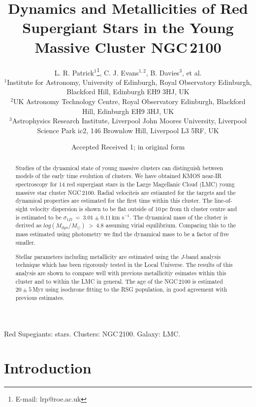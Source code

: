 \documentclass[useAMS,usenatbib]{mn2e}
\title[Dynamics and Metallicities in NGC\,2100]{Dynamics and Metallicities of Red Supergiant Stars in the Young Massive Cluster NGC\,2100}
\author[L. R. Patrick et al.]{L. R. Patrick$^{1}$\thanks{E-mail: lrp@roe.ac.uk}, C. J. Evans$^{1, 2}$, B. Davies$^{3}$, et al.\\
$^{1}$Institute for Astronomy, University of Edinburgh, Royal Observatory Edinburgh, Blackford Hill, Edinburgh EH9 3HJ, UK\\
$^{2}$UK Astronomy Technology Centre, Royal Observatory Edinburgh, Blackford Hill, Edinburgh EH9 3HJ, UK\\
$^{3}$Astrophysics Research Institute, Liverpool John Moores University, Liverpool Science Park ic2, 146 Brownlow Hill, Liverpool L3 5RF, UK
}
\def\kms{$\mbox{km s}^{-1}$}
\begin{document}
\date{Accepted  Received 1; in original form}

\pagerange{\pageref{firstpage}--\pageref{lastpage}} 

\maketitle

\label{firstpage}

\begin{abstract}
Studies of the dynamical state of young massive clusters can distinguish between models of the early time evolution of clusters.
We have obtained KMOS near-IR spectroscopy for 14 red supergiant stars in the Large Magellanic Cloud (LMC) young massive star cluster NGC\,2100.
Radial velociteis are estiamted for the targets and the dynamical properties are estimated for the first time within this cluster.
The line-of-sight velocity dispersion is shown to be flat outside of 10\,pc from th cluster centre and is estimated to be
$\sigma_{1D}~=~3.01\pm0.11\,$\kms.
The dynamical mass of the cluster is derived as
$log(M_{dyn}/M_{\odot})~>~4.8$ assuming virial equilibrium.
Comparing this to the mass estimated using photometry we find the dynamical mass to be a factor of five smaller.

Stellar parameters including metallicity are estimated using the $J$-band analysis technique which has been rigorously tested in the Local Universe.
The results of this analysis are shown to compare well with previous metallicitiy esimates within this cluster and to within the LMC in general.
The age of the NGC\,2100 is estimated $20\pm5\,$Myr using isochrone fitting to the RSG population, in good agreement with previous estimates.

\end{abstract}

\begin{keywords}
Red Supegiants: stars. Clusters: NGC\,2100. Galaxy: LMC.
\end{keywords}

\section{Introduction} %
\label{sec:introduction}

\end{document}

